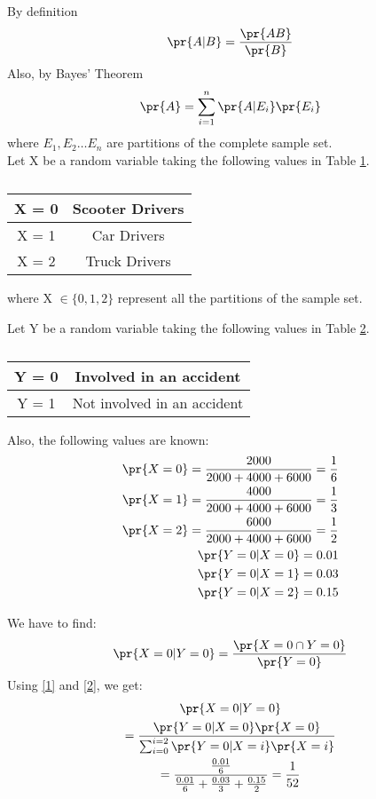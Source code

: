 By definition
\begin{align}
\pr{A|B} = \frac{\pr{AB}}{\pr{B}} \label{5.18:1}
\end{align}
Also, by Bayes' Theorem
\begin{align}
\pr{A} = \sum_{i=1}^n \pr{A|E_i}\pr{E_i}\label{5.18:2}
\end{align}
where $E_1 , E_2 \ldots E_n$  are partitions of the complete sample set.\\

Let X be a random variable taking the following values in Table \ref{table:5.18}.
\begin{table}[!ht]
\begin{center}
\begin{tabular}{ |c|c| } 
 \hline
 X = 0 & Scooter Drivers\\
 \hline
 X = 1 & Car Drivers\\
 \hline
X = 2 & Truck Drivers\\
 \hline
\end{tabular}
\end{center}
\caption{}
\label{table:5.18}
\end{table}
where X $\in \{0, 1, 2\}$ represent all the partitions of the sample set.


Let Y be a random variable taking the following values in Table \ref{table:5.18_1}.
\begin{table}[!ht]
\begin{center}
\begin{tabular}{ |c|c| } 
 \hline
 Y = 0 & Involved in an accident\\
 \hline
 Y = 1 & Not involved in an accident\\
 \hline
\end{tabular}
\end{center}
\caption{}
\label{table:5.18_1}
\end{table}

 Also, the following values are known:
\begin{align}
\pr{X = 0} = \frac{2000}{2000+4000+6000} = \frac{1}{6}\\
\pr{X = 1} = \frac{4000}{2000+4000+6000} = \frac{1}{3}\\
\pr{X = 2} = \frac{6000}{2000+4000+6000} = \frac{1}{2}\\
\pr{Y = 0|X = 0} = 0.01\\
\pr{Y = 0|X = 1} = 0.03\\
\pr{Y = 0|X = 2} = 0.15
\end{align}

We have to find:
\begin{align}
\pr{X = 0|Y = 0} = \frac{\pr{X = 0 \cap Y = 0}}{\pr{Y = 0}}
\end{align}
Using \eqref{1} and \eqref{2}, we get:
\begin{multline}
\pr{X = 0|Y = 0} 
\\
= \frac{\pr{Y = 0|X = 0}\pr{X = 0}}{\sum_{i=0}^{i=2}\pr{Y = 0 | X = i}\pr{X = i}}
\\
= \frac{\frac{0.01}{6}}{\frac{0.01}{6} + \frac{0.03}{3} + \frac{0.15}{2}}
 = \frac{1}{52}
\end{multline}

